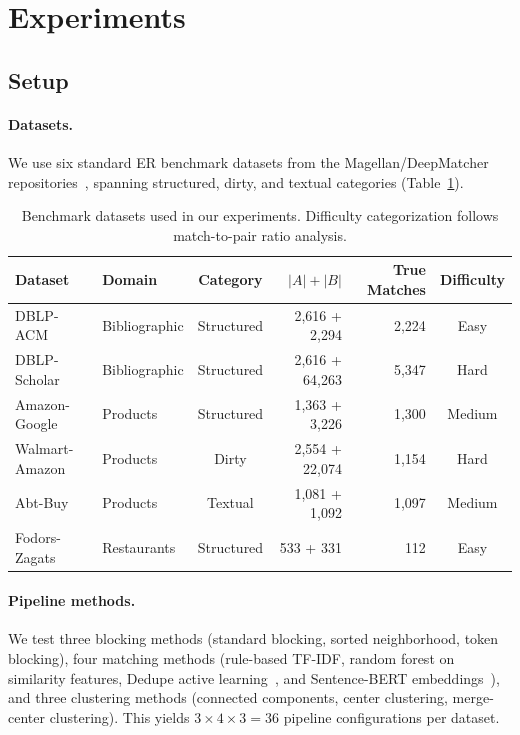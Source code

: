 \documentclass{article}
\begin{document}
\section{Experiments}
\label{sec:experiments}

\subsection{Setup}

\paragraph{Datasets.}
We use six standard ER benchmark datasets from the Magellan/DeepMatcher repositories~\citep{konda2016magellan,mudgal2018deep}, spanning structured, dirty, and textual categories (Table~\ref{tab:datasets}).

\begin{table}[t]
\caption{Benchmark datasets used in our experiments. Difficulty categorization follows match-to-pair ratio analysis.}
\label{tab:datasets}
\centering
\begin{tabular}{llcrrc}
\toprule
Dataset & Domain & Category & $|A| + |B|$ & True Matches & Difficulty \\
\midrule
DBLP-ACM & Bibliographic & Structured & 2,616 + 2,294 & 2,224 & Easy \\
DBLP-Scholar & Bibliographic & Structured & 2,616 + 64,263 & 5,347 & Hard \\
Amazon-Google & Products & Structured & 1,363 + 3,226 & 1,300 & Medium \\
Walmart-Amazon & Products & Dirty & 2,554 + 22,074 & 1,154 & Hard \\
Abt-Buy & Products & Textual & 1,081 + 1,092 & 1,097 & Medium \\
Fodors-Zagats & Restaurants & Structured & 533 + 331 & 112 & Easy \\
\bottomrule
\end{tabular}
\end{table}

\paragraph{Pipeline methods.}
We test three blocking methods (standard blocking, sorted neighborhood, token blocking), four matching methods (rule-based TF-IDF, random forest on similarity features, Dedupe active learning~\citep{fellegi1969theory}, and Sentence-BERT embeddings~\citep{reimers2019sentence}), and three clustering methods (connected components, center clustering, merge-center clustering). This yields $3 \times 4 \times 3 = 36$ pipeline configurations per dataset.
\end{document}
